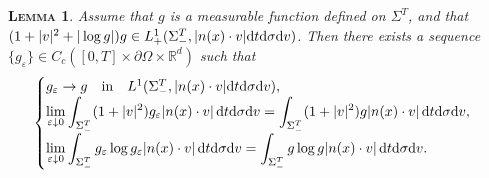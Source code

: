 \documentclass[10pt, reqno]{amsart}
\theoremstyle{plain}
\newtheorem{lemma}[theorem]{\normalfont \scshape Lemma}
\theoremstyle{definition}
\theoremstyle{remark}
\numberwithin{equation}{section}
\newcommand{\p}{\partial}
\newcommand{\R}{\mathbb{R}}
\newcommand{\ve}{\varepsilon}
\newcommand{\dv}{\textnormal{d}v}
\newcommand{\dt}{\textnormal{d}t}
\newcommand{\tnd}{\textnormal{d}}
\begin{document}
\begin{lemma}
    Assume that $g$ is a measurable function defined on $\Sigma^T$, and that $(1+|v|^2 + |\log g|)g\in L^1_+(\Sigma_-^T, |n(x)\cdot v|\dt\tnd\sigma\dv)$. Then there exists a sequence $\{g_\ve\} \in C_c([0,T]\times \p\Omega \times\R^d)$ such that
    \begin{align}\label{eq: app: condition}
        \begin{cases}
        g_\ve \to g \quad \text{in} \quad L^1(\Sigma_-^T, |n(x)\cdot v|\dt\tnd\sigma\dv), \\
        \displaystyle\lim_{\ve\downarrow 0} \int_{\Sigma_-^T} (1+|v|^2) g_\ve |n(x)\cdot v| \,\dt\tnd\sigma\dv = \int_{\Sigma_-^T} (1+|v|^2) g |n(x)\cdot v| \,\dt\tnd\sigma\dv, \\
        \displaystyle\lim_{\ve\downarrow 0} \int_{\Sigma_-^T} g_\ve \log g_\ve |n(x)\cdot v| \,\dt\tnd\sigma\dv = \int_{\Sigma_-^T} g \log g |n(x)\cdot v| \,\dt\tnd\sigma\dv.
        \end{cases}
    \end{align}
\end{lemma}
\end{document}
